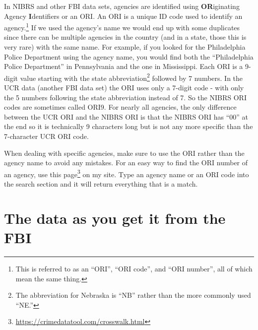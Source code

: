 \documentclass[
]{krantz}
\renewcommand{\href}[2]{#2\footnote{\url{#1}}}
\begin{document}
In NIBRS and other FBI data sets, agencies are identified
using \textbf{OR}iginating Agency \textbf{I}dentifiers or an
ORI. An ORI is a unique ID code used to identify an
agency.\footnote{This is referred to as an ``ORI'', ``ORI
  code'', and ``ORI number'', all of which mean the same
  thing.} If we used the agency's name we would end up with
some duplicates since there can be multiple agencies in the
country (and in a state, those this is very rare) with the
same name. For example, if you looked for the Philadelphia
Police Department using the agency name, you would find both
the ``Philadelphia Police Department'' in Pennsylvania and
the one in Mississippi. Each ORI is a 9-digit value starting
with the state abbreviation\footnote{The abbreviation for
  Nebraska is ``NB'' rather than the more commonly used
  ``NE.''} followed by 7 numbers. In the UCR data (another
FBI data set) the ORI uses only a 7-digit code - with only
the 5 numbers following the state abbreviation instead of 7.
So the NIBRS ORI codes are sometimes called ORI9. For nearly
all agencies, the only difference between the UCR ORI and
the NIBRS ORI is that the NIBRS ORI has ``00'' at the end so
it is technically 9 characters long but is not any more
specific than the 7-character UCR ORI code.

When dealing with specific agencies, make sure to use the
ORI rather than the agency name to avoid any mistakes. For
an easy way to find the ORI number of an agency, use
\href{https://crimedatatool.com/crosswalk.html}{this page}
on my site. Type an agency name or an ORI code into the
search section and it will return everything that is a
match.

\section{The data as you get it from the
FBI}\label{the-data-as-you-get-it-from-the-fbi}
\end{document}
